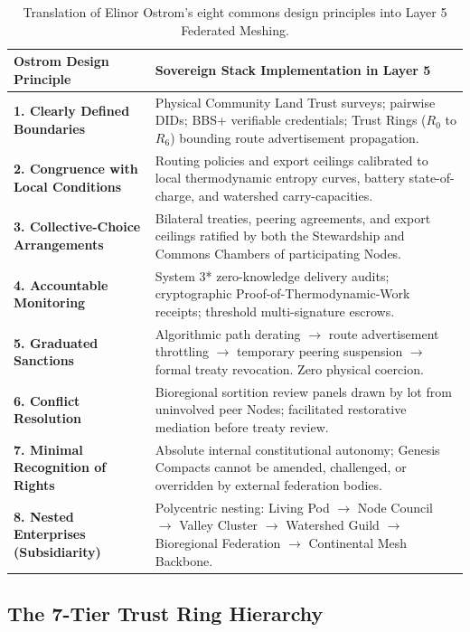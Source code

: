 \begin{table}[htbp]
\centering
\small
\setlength{\tabcolsep}{4pt}
\begin{tabular}{|p{}|p{}|}
\hline
\textbf{Ostrom Design Principle} & \textbf{Sovereign Stack Implementation in Layer 5} \\
\hline
\textbf{1. Clearly Defined Boundaries} & Physical Community Land Trust surveys; pairwise DIDs; BBS+ verifiable credentials; Trust Rings ($R_0$ to $R_6$) bounding route advertisement propagation. \\
\hline
\textbf{2. Congruence with Local Conditions} & Routing policies and export ceilings calibrated to local thermodynamic entropy curves, battery state-of-charge, and watershed carry-capacities. \\
\hline
\textbf{3. Collective-Choice Arrangements} & Bilateral treaties, peering agreements, and export ceilings ratified by both the Stewardship and Commons Chambers of participating Nodes. \\
\hline
\textbf{4. Accountable Monitoring} & System 3* zero-knowledge delivery audits; cryptographic Proof-of-Thermodynamic-Work receipts; threshold multi-signature escrows. \\
\hline
\textbf{5. Graduated Sanctions} & Algorithmic path derating $\to$ route advertisement throttling $\to$ temporary peering suspension $\to$ formal treaty revocation. Zero physical coercion. \\
\hline
\textbf{6. Conflict Resolution} & Bioregional sortition review panels drawn by lot from uninvolved peer Nodes; facilitated restorative mediation before treaty review. \\
\hline
\textbf{7. Minimal Recognition of Rights} & Absolute internal constitutional autonomy; Genesis Compacts cannot be amended, challenged, or overridden by external federation bodies. \\
\hline
\textbf{8. Nested Enterprises (Subsidiarity)} & Polycentric nesting: Living Pod $\to$ Node Council $\to$ Valley Cluster $\to$ Watershed Guild $\to$ Bioregional Federation $\to$ Continental Mesh Backbone. \\
\hline
\end{tabular}
\caption{Translation of Elinor Ostrom's eight commons design principles into Layer 5 Federated Meshing.}
\label{tab:l5-ostrom-mapping}
\end{table}

\subsection{The 7-Tier Trust Ring Hierarchy}
\label{subsec:l5-trust-rings}

